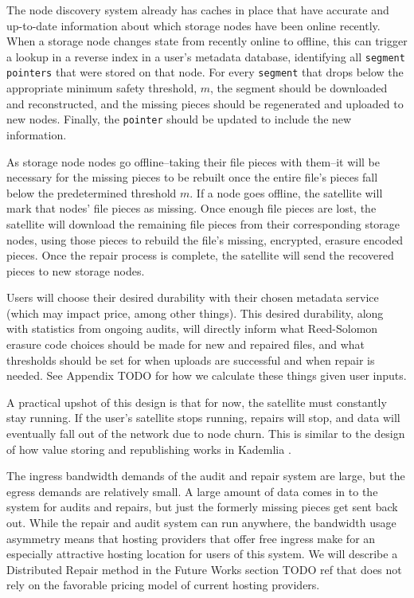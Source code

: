 \documentclass[11pt,fleqn,openany]{book}
\newcommand{\x}[1]{{\tt #1}} \newcommand{\code}[1]{{\tt #1}}
\newcommand{\todo}[1]{{\color{red} TODO #1 }}
\begin{document}
The node discovery system already has caches in place that have accurate and
up-to-date information about which storage nodes have been online recently.
When a storage node changes state from recently online to offline, this can
trigger a lookup in a reverse index in a user's metadata database, identifying
all \x{segment} \x{pointers} that were stored on that node.
For every \x{segment} that drops below the appropriate minimum safety
threshold, $m$, the segment should be downloaded and reconstructed, and the
missing pieces should be regenerated and uploaded to new nodes. Finally, the
\x{pointer} should be updated to include the new information.

As storage node nodes go offline--taking their file pieces with them--it will
be necessary for the missing pieces to be rebuilt once the entire file's pieces
fall below the predetermined threshold $m$. If a node goes offline, the
satellite will mark that nodes' file pieces as missing.
Once enough file pieces are lost, the satellite will download the
remaining file pieces from their corresponding storage nodes, using those
pieces
to rebuild the file's missing, encrypted, erasure encoded pieces.
Once the repair process is complete, the satellite will send the
recovered pieces to new storage nodes.

Users will choose their desired durability with their chosen metadata service
(which may impact price, among other things). This desired durability, along
with
statistics from ongoing audits, will directly inform what Reed-Solomon erasure
code choices should be made for new and repaired files, and what thresholds
should be set for when uploads are successful and when repair is needed. See
Appendix \todo{} for how we calculate these things given user inputs.

A practical upshot of this design is that for now, the satellite must
constantly stay running. If the user's satellite stops running, repairs will
stop, and data will eventually fall out of the network due to node churn. This
is similar to the design of how value storing and republishing works in
Kademlia \cite{kad}.

The ingress bandwidth demands of the audit and repair system are large, but the
egress demands are relatively small. A large amount of data comes in to the
system for audits and repairs, but just the formerly missing pieces get sent
back out.
While the repair and audit system can run anywhere, the bandwidth usage
asymmetry means that hosting providers that offer free ingress
make for an especially attractive hosting location for users of this system.
We will describe a Distributed Repair method in the Future Works section
\todo{ref} that
does not rely on the favorable pricing model of current hosting providers.
\end{document}
